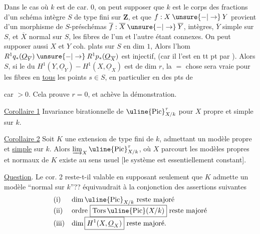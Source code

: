 Dans le cas où $k$ est de car. $0$, on peut supposer que $k$ est
le corps des fractions d'un schéma intègre $S$ de type fini sur $\mathbf Z$,
et que $f:X\mathbin{\unsure{-|\to}}Y$ provient d'un morphisme de
$S$-préschémas $\overline f:\overline X\mathbin{\unsure{-|\to}}\overline Y$,
intègres, $\overline Y$ simple sur $S$, et $\overline X$
 normal sur $S$, les fibres de l'un et l'autre étant
 connexes.
On peut supposer aussi $X$ et $Y$ coh. plats sur $S$ en dim $1$,
Alors 
l'hom
$R^1q_*(\underline O_{\overline Y})\mathbin{\unsure{-|\to}}
R^1p_*(\underline O_{\overline X})$
est injectif, 
(car il l'est en tt pt par ).
Alors  $S$, si le 
du $H^1(Y,\underline O_Y)\mathbin{-}H^1(X,\underline O_X)$
est de dim $r$, la $=$ chose sera vraie pour les fibres en \uline{tous}
les points $s\in S$, en particulier en des pts de

car $>0$. Cela prouve $r=0$, et achève la démonstration.

\uline{Corollaire 1} Invariance birationnelle de $\uline{\mathrm{Pic}}^\tau_{X/k}$
pour $X$ propre et simple sur $k$.

\uline{Corollaire 2} Soit $K$ une extension
de type fini de $k$, admettant un modèle 
propre et \uline{simple} sur $k$. Alors
$\varinjlim_X\uline{\mathrm{Pic}}^\tau_{X/k}$, où $X$ parcourt
les modèles propres et normaux  de $K$
existe au sens usuel [le système 
est essentiellement constant].


\uline{Question}. Le cor. 2 reste-t-il valable
en supposant seulement que $K$ admette
un modèle ``normal sur $k$''??
 équivaudrait à la conjonction des
assertions suivantes
\[
\begin{array}{ll}
\text{(i)}&\dim\uline{\mathrm{Pic}}_{X/k}\text{ reste majoré}\\
\text{(ii)}&\text{ordre }\boxed{\mathrm{Tors}\,\uline{\mathrm{Pic}}(X/k)}
                    \text{ reste majoré}\\
\text{(iii)}&\dim\boxed{H^1(X,\underline O_X)}\text{ reste majoré.}
\end{array}
\]

